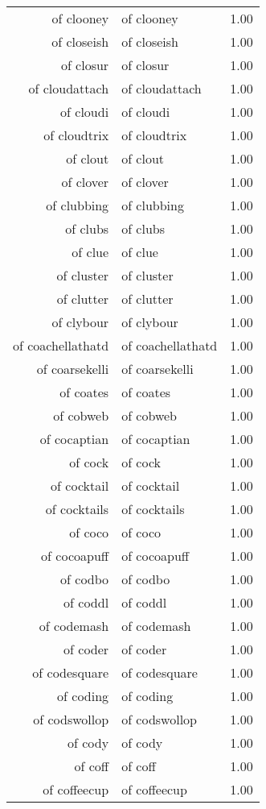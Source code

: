 \begin{table}[ht]
\begin{tabular}{rlr}
  of clooney & of clooney & 1.00 \\ 
  of closeish & of closeish & 1.00 \\ 
  of closur & of closur & 1.00 \\ 
  of cloudattach & of cloudattach & 1.00 \\ 
  of cloudi & of cloudi & 1.00 \\ 
  of cloudtrix & of cloudtrix & 1.00 \\ 
  of clout & of clout & 1.00 \\ 
  of clover & of clover & 1.00 \\ 
  of clubbing & of clubbing & 1.00 \\ 
  of clubs & of clubs & 1.00 \\ 
  of clue & of clue & 1.00 \\ 
  of cluster & of cluster & 1.00 \\ 
  of clutter & of clutter & 1.00 \\ 
  of clybour & of clybour & 1.00 \\ 
  of coachellathatd & of coachellathatd & 1.00 \\ 
  of coarsekelli & of coarsekelli & 1.00 \\ 
  of coates & of coates & 1.00 \\ 
  of cobweb & of cobweb & 1.00 \\ 
  of cocaptian & of cocaptian & 1.00 \\ 
  of cock & of cock & 1.00 \\ 
  of cocktail & of cocktail & 1.00 \\ 
  of cocktails & of cocktails & 1.00 \\ 
  of coco & of coco & 1.00 \\ 
  of cocoapuff & of cocoapuff & 1.00 \\ 
  of codbo & of codbo & 1.00 \\ 
  of coddl & of coddl & 1.00 \\ 
  of codemash & of codemash & 1.00 \\ 
  of coder & of coder & 1.00 \\ 
  of codesquare & of codesquare & 1.00 \\ 
  of coding & of coding & 1.00 \\ 
  of codswollop & of codswollop & 1.00 \\ 
  of cody & of cody & 1.00 \\ 
  of coff & of coff & 1.00 \\ 
  of coffeecup & of coffeecup & 1.00 \\ 

\end{tabular}
\end{table}
